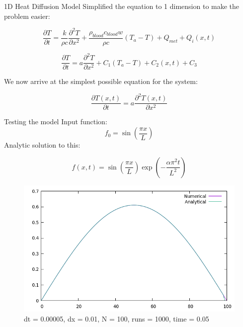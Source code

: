 \documentclass{beamer}
\begin{document}
	\begin{frame}{1D Heat Diffusion Model}
Simplified the equation to 1 dimension to make the problem easier:

\begin{equation}
\frac{\partial T}{\partial t} =  \frac{k}{\rho c} \frac{\partial ^2 T}{\partial x^2} +  \frac{\rho _{blood} c_{blood}w}{\rho c}(T_{a} - T) + Q_{met} + Q_i(x,t)
\end{equation}

\begin{equation}
\frac{\partial T}{\partial t} =  a \frac{\partial ^2 T}{\partial x^2} +  C_1(T_{a} - T) + C_2(x,t) + C_3
\end{equation}

We now arrive at the simplest possible equation for the system:

\begin{equation}
\frac{\partial T(x,t)}{\partial t} =  a \frac{\partial ^2 T(x,t)}{\partial x^2}
\end{equation}


	\end{frame}
	
	\begin{frame}{Testing the model}
	Input function:
	\begin{equation}
	f_0 = \sin \left( \frac{\pi x}{L} \right)
	\end{equation}
	Analytic solution to this:
	
	\begin{equation}
	f(x,t) = \sin \left( \frac{\pi x }{L} \right) \exp \left( - \frac{\alpha \pi ^2 t}{L^2} \right) 
	\end{equation}
	\end{frame}
	
	\begin{frame}
	\begin{figure}
	\centering
	\includegraphics[scale=0.5]{1.png}
	\caption{dt = 0.00005, dx = 0.01, N = 100, runs = 1000, time = 0.05}
\end{figure}
	\end{frame}
	
\end{document}
